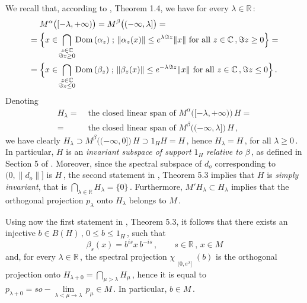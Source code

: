 \documentclass[reqno]{amsart}
\theoremstyle{definition}
\theoremstyle{remark}
\numberwithin{equation}{section}
\theoremstyle{plain}
\begin{document}
We recall that, according to \cite{Z2}, Theorem 1.4, we have for
every $\lambda\in\mathbb R\,$:
\begin{equation}\label{spectr.subsp.}
\begin{split}
&M^\alpha\big( [-\lambda , +\infty )\big) =
M^\beta\big( (-\infty ,\lambda ]\big) = \\
=\;&\Big\{ x\in \!\bigcap_{\substack{{z\in\mathbb C}\\{\Im z\geq 0}}}\!
{\rm Dom}\, (\alpha_z )\; ;\, \|\alpha_z (x)\|\leq e^{\lambda \Im z}
\| x\|\text{ for all } z\in\mathbb C\, ,\Im z\geq 0 \Big\} = \\
=\;&\Big\{ x\in \!\bigcap_{\substack{{z\in\mathbb C}\\{\Im z\leq 0}}}\!
{\rm Dom}\, (\beta_z )\; ;\, \|\beta_z (x)\|\leq e^{-\lambda \Im z}
\| x\|\text{ for all } z\in\mathbb C\, ,\Im z\leq 0 \Big\}\, .
\end{split}
\end{equation}
Denoting
\begin{align*}
H_\lambda =\; &\text{the closed linear span of }M^\alpha\big(
[-\lambda ,+\infty )\big)\, H = \\
=\; &\text{the closed linear span of }M^\beta\big(
(-\infty ,\lambda ]\big)\, H\, ,
\end{align*}
we have clearly $H_\lambda \supset M^\beta\big((-\infty ,0]\big)
\, H\supset 1_H H = H\,$, hence $H_\lambda =H\,$, for all $\lambda
\geq 0\,$. In particular, $H$ is an
\emph{invariant subspace of support} $1_H$ \emph{relative to}
$\beta\,$, as defined in Section 5 of \cite{Z2}.
Moreover, since the spectral subspace of $d_o$ corresponding to
$(0,\| d_o\| ]$ is $H\,$, the second statement in \cite{Z2},
Theorem 5.3 implies that $H$ is \emph{simply invariant}, that is
$\displaystyle \bigcap_{\lambda\in\mathbb R} H_\lambda =\{ 0\}\,$.
Furthermore, $M' H_\lambda\subset H_\lambda$ implies that the
orthogonal projection $p_\lambda$ onto $H_\lambda$ belongs to $M\,$.

Using now the first statement in \cite{Z2}, Theorem 5.3, it follows
that there exists an injective $b\in B(H)\, ,\, 0\leq b\leq 1_H\,$,
such that
\begin{equation}\label{impl.}
\beta_s (x) =b^{is} x\, b^{-is}\, ,\qquad s\in\mathbb R\, ,\,
x\in M
\end{equation}
and, for every $\lambda\in\mathbb R\,$, the spectral projection
$\chi_{\substack{{}\\{(0,e^\lambda ]}}} (b)$ is the orthogonal
projection onto $\displaystyle H_{\lambda +0} =\bigcap_{\mu >
\lambda} H_\mu\,$, hence it is equal to $p_{\lambda +0} =
so-\lim\limits_{\lambda <\mu\to\lambda}\, p_\mu\in M\,$.
In particular, $b\in M\,$.
\end{document}
